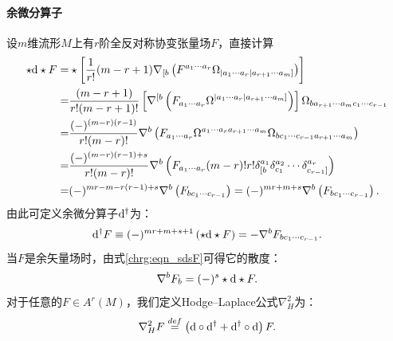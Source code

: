 \paragraph{余微分算子} 
设$m$维流形$M$上有$r$阶全反对称协变张量场$F$，直接计算
\begin{align*}
	\star {\rm d} \star F =& \star \left[\frac{1}{r!} (m-r+1) \nabla_{[b}	\left( 
	F^{a_1 \cdots a_r} \Omega_{|a_1 \cdots a_r| a_{r+1} \cdots a_m]}\right)\right] \\
	=& \frac{(m-r+1)}{r!(m-r+1)!} \left[\nabla^{[b}	\left( 
	F_{a_1 \cdots a_r} \Omega^{|a_1 \cdots a_r| a_{r+1} \cdots a_m]}\right)\right]
	\Omega_{b a_{r+1} \cdots a_m c_{1} \cdots c_{r-1}} \\
	=& \frac{(-)^{(m-r)(r-1)}}{r!(m-r)!} \nabla^{b}	\left( 
	F_{a_1 \cdots a_r} \Omega^{a_1 \cdots a_r a_{r+1} \cdots a_m}
	\Omega_{b c_{1} \cdots c_{r-1} a_{r+1} \cdots a_m } \right) \\
	=& \frac{(-)^{(m-r)(r-1)+s}}{r!(m-r)!} \nabla^{b}	\left(	F_{a_1 \cdots a_r} 	(m-r)! r! 
	\delta_{\lbrack b}^{a_1} \delta_{c_1}^{a_2}\cdots \delta_{c_{r-1} \rbrack}^{a_r}   \right) \\
	=& (-)^{mr - m - r(r-1)+s} \nabla^{b} \left(F_{b c_1 \cdots c_{r-1}} \right)
	= (-)^{mr+m+s} \nabla^{b} \left(F_{b c_1 \cdots c_{r-1}} \right) .
\end{align*}
由此可定义余微分算子${\rm d}^{\dagger}$为：
\begin{equation}\label{chrg:eqn_sdsF}
	{\rm d}^{\dagger} F \equiv (-)^{mr+m+s+1} \left(\star {\rm d} \star F\right) 
	= -\nabla^{b} F_{b c_1 \cdots c_{r-1}} .
\end{equation}
当$F$是余矢量场时，由式\eqref{chrg:eqn_sdsF}可得它的散度：
\begin{equation}
	\nabla^{b} F_{b} = (-)^{s} \star {\rm d} \star F .
\end{equation}
对于任意的$F\in A^r(M)$，我们定义Hodge--Laplace公式$\nabla^2_H$为：
\begin{equation}\label{chrg:eqn_HL}
	\nabla^2_H F \overset{def}{=}
	\left({\rm d}\circ{\rm d}^{\dagger} +{\rm d}^{\dagger}\circ{\rm d}\right)F.
\end{equation}	


